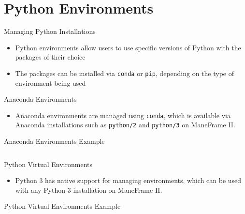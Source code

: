 \section{Python Environments}

\begin{frame}{Managing Python Installations}
\begin{itemize}
\item Python environments allow users to use specific versions of Python with
the packages of their choice
\item The packages can be installed via \texttt{conda} or
\texttt{pip}, depending on the type of environment being used
\end{itemize}
\end{frame}

\begin{frame}{Anaconda Environments}
\begin{itemize}
\item Anaconda environments are managed using \texttt{conda}, which is
available via Anaconda installations such as \texttt{python/2} and
\texttt{python/3} on ManeFrame II.
\end{itemize}
\end{frame}

\begin{frame}{Anaconda Environments Example}
\begin{listing}[H]
\inputminted[firstline=3,firstnumber=1]{sh}{examples/conda_environments.sh}
\caption{A specific version of Python is installed along with the JupyterLab
package and its dependencies. The new environment is then loaded and then
unloaded.}
\end{listing}
\end{frame}

\begin{frame}{Python Virtual Environments}
\begin{itemize}
\item Python 3 has native support for managing environments, which can be used
with any Python 3 installation on ManeFrame II.
\end{itemize}
\end{frame}

\begin{frame}{Python Virtual Environments Example}
\begin{listing}[H]
\inputminted[firstline=3,firstnumber=1]{sh}{examples/python_environments.sh}
\caption{A specific installation of Python, in this case from Spack, is used
and then JupyterLab and its dependencies are installed. The new environment is
then loaded and then unloaded.}
\end{listing}
\end{frame}

